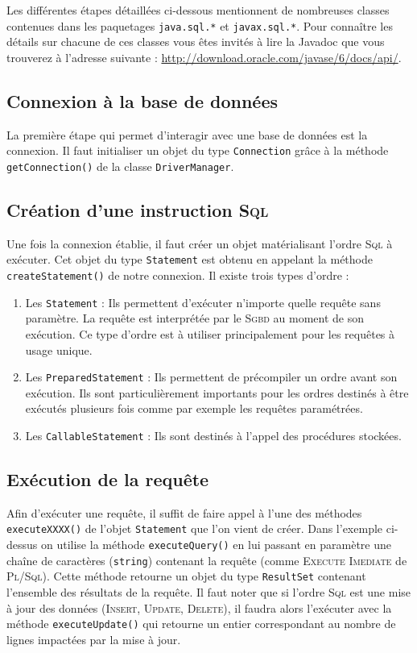\documentclass[a4paper,11pt]{article}
\begin{document}
Les différentes étapes détaillées ci-dessous mentionnent de nombreuses classes contenues dans les paquetages 
\texttt{java.sql.*} et \texttt{javax.sql.*}. Pour connaître les détails sur chacune de ces classes vous êtes 
invités à lire la Javadoc que vous trouverez à l'adresse suivante : \url{http://download.oracle.com/javase/6/docs/api/}.

\subsection{Connexion à la base de données}
La première étape qui permet d'interagir avec une base de données est la connexion. Il faut initialiser 
un objet du type \texttt{Connection} grâce à la méthode \texttt{getConnection()} de la classe \texttt{DriverManager}.

\subsection{Création d'une instruction \textsc{Sql}}
Une fois la connexion établie, il faut créer un objet matérialisant l'ordre \textsc{Sql} à exécuter. Cet objet 
du type \texttt{Statement} est obtenu en appelant la méthode \texttt{createStatement()} de notre connexion.
Il existe trois types d'ordre : 
\begin{enumerate}
	\item Les \texttt{Statement} : Ils permettent d'exécuter n'importe quelle requête sans paramètre. La requête est 
	interprétée par le \textsc{Sgbd} au moment de son exécution. Ce type d'ordre est à utiliser principalement 
	pour les requêtes à usage unique.
	\item Les \texttt{PreparedStatement} : Ils permettent de précompiler un ordre avant son exécution. Ils sont 
	particulièrement importants pour les ordres destinés à être exécutés plusieurs fois comme par exemple les 
	requêtes paramétrées.
	\item Les \texttt{CallableStatement} : Ils sont destinés à l'appel des procédures stockées.
\end{enumerate}

\subsection{Exécution de la requête}
Afin d'exécuter une requête, il suffit de faire appel à l'une des méthodes \texttt{executeXXXX()} de l'objet \texttt{Statement} 
que l'on vient de créer. Dans l'exemple ci-dessus on utilise la méthode \texttt{executeQuery()} en lui passant 
en paramètre une chaîne de caractères (\texttt{string}) contenant la requête (comme \textsc{Execute Imediate} 
de \textsc{Pl/Sql}). Cette méthode retourne un objet du type \texttt{ResultSet} contenant l'ensemble des résultats de la 
requête. Il faut noter que si l'ordre \textsc{Sql} est une mise à jour des données (\textsc{Insert}, 
\textsc{Update}, \textsc{Delete}), il faudra alors l'exécuter avec la méthode \texttt{executeUpdate()} qui 
retourne un entier correspondant au nombre de lignes impactées par la mise à jour.
\end{document}
